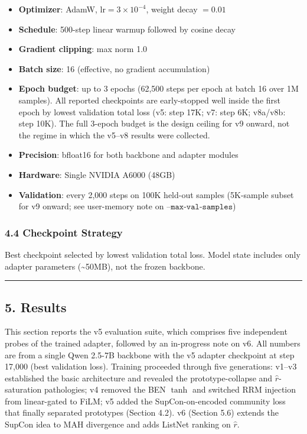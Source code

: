 \documentclass[
  11pt]{article}
\providecommand{\tightlist}{%
  \setlength{\itemsep}{0pt}\setlength{\parskip}{0pt}}
\begin{document}
\begin{itemize}
\tightlist
\item
  \textbf{Optimizer}: AdamW, \(\text{lr} = 3 \times 10^{-4}\), weight
  decay \(= 0.01\)
\item
  \textbf{Schedule}: 500-step linear warmup followed by cosine decay
\item
  \textbf{Gradient clipping}: max norm 1.0
\item
  \textbf{Batch size}: 16 (effective, no gradient accumulation)
\item
  \textbf{Epoch budget}: up to 3 epochs (62,500 steps per epoch at batch
  16 over 1M samples). All reported checkpoints are early-stopped well
  inside the first epoch by lowest validation total loss (v5: step 17K;
  v7: step 6K; v8a/v8b: step 10K). The full 3-epoch budget is the design
  ceiling for v9 onward, not the regime in which the v5--v8 results were
  collected.
\item
  \textbf{Precision}: bfloat16 for both backbone and adapter modules
\item
  \textbf{Hardware}: Single NVIDIA A6000 (48GB)
\item
  \textbf{Validation}: every 2,000 steps on 100K held-out samples
  (5K-sample subset for v9 onward; see user-memory note on
  \(\texttt{--max-val-samples}\))
\end{itemize}

\subsubsection{4.4 Checkpoint Strategy}\label{checkpoint-strategy}

Best checkpoint selected by lowest validation total loss. Model state
includes only adapter parameters (\textasciitilde50MB), not the frozen
backbone.

\begin{center}\rule{0.5\linewidth}{0.5pt}\end{center}

\subsection{5. Results}\label{results}

This section reports the v5 evaluation suite, which comprises five
independent probes of the trained adapter, followed by an in-progress
note on v6. All numbers are from a single Qwen 2.5-7B backbone with the
v5 adapter checkpoint at step 17,000 (best validation loss). Training
proceeded through five generations: v1--v3 established the basic
architecture and revealed the prototype-collapse and
\(\hat{r}\)-saturation pathologies; v4 removed the BEN \(\tanh\) and
switched RRM injection from linear-gated to FiLM; v5 added the
SupCon-on-encoded community loss that finally separated prototypes
(Section 4.2). v6 (Section 5.6) extends the SupCon idea to MAH
divergence and adds ListNet ranking on \(\hat{r}\).
\end{document}
